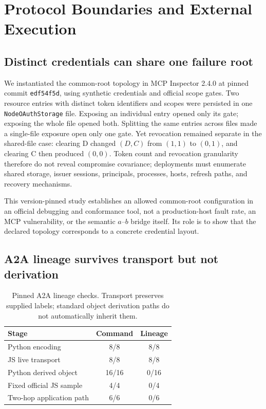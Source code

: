 \section{Protocol Boundaries and External Execution}
\label{sec:external}

\subsection{Distinct credentials can share one failure root}

We instantiated the common-root topology in MCP Inspector 2.4.0 at pinned
commit \texttt{edf54f5d}, using synthetic credentials and official scope
gates. Two resource entries with distinct token identifiers and scopes were
persisted in one \texttt{NodeOAuthStorage} file. Exposing an individual entry
opened only its gate; exposing the whole file opened both. Splitting the same
entries across files made a single-file exposure open only one gate. Yet
revocation remained separate in the shared-file case: clearing D changed
$(D,C)$ from $(1,1)$ to $(0,1)$, and clearing C then produced $(0,0)$.
Token count and revocation granularity therefore do not reveal compromise
covariance; deployments must enumerate shared storage, issuer sessions,
principals, processes, hosts, refresh paths, and recovery mechanisms.

This version-pinned study establishes an allowed common-root configuration in
an official debugging and conformance tool, not a production-host fault rate,
an MCP vulnerability, or the semantic $a$--$b$ bridge itself. Its role is to
show that the declared topology corresponds to a concrete credential layout.

\subsection{A2A lineage survives transport but not derivation}

\begin{table}[t]
  \centering
  \footnotesize
  \caption{Pinned A2A lineage checks. Transport preserves supplied labels;
  standard object derivation paths do not automatically inherit them.}
  \label{tab:a2a-lineage}
  \setlength{\tabcolsep}{3pt}
  \begin{tabular}{lcc}
    \toprule
    Stage & Command & Lineage \\
    \midrule
    Python encoding & 8/8 & 8/8 \\
    JS live transport & 8/8 & 8/8 \\
    Python derived object & 16/16 & 0/16 \\
    Fixed official JS sample & 4/4 & 0/4 \\
    Two-hop application path & 6/6 & 0/6 \\
    \bottomrule
  \end{tabular}
\end{table}

